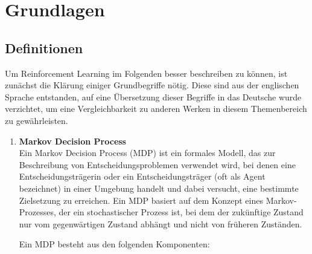 \section{Grundlagen}


\subsection{Definitionen}
Um Reinforcement Learning im Folgenden besser beschreiben zu können, ist zunächst die Klärung einiger Grundbegriffe nötig. Diese sind aus der englischen Sprache entstanden, auf eine Übersetzung dieser Begriffe in das Deutsche wurde verzichtet, um eine Vergleichbarkeit zu anderen Werken in diesem Themenbereich zu gewährleisten.

\begin{enumerate}
    \item \textbf{Markov Decision Process}\\
    Ein Markov Decision Process (MDP) ist ein formales Modell, das zur Beschreibung von Entscheidungsproblemen verwendet wird, bei denen eine Entscheidungsträgerin oder ein Entscheidungsträger (oft als Agent bezeichnet) in einer Umgebung handelt und dabei versucht, eine bestimmte Zielsetzung zu erreichen. Ein MDP basiert auf dem Konzept eines Markov-Prozesses, der ein stochastischer Prozess ist, bei dem der zukünftige Zustand nur vom gegenwärtigen Zustand abhängt und nicht von früheren Zuständen.

    Ein MDP besteht aus den folgenden Komponenten:


\end{enumerate}
